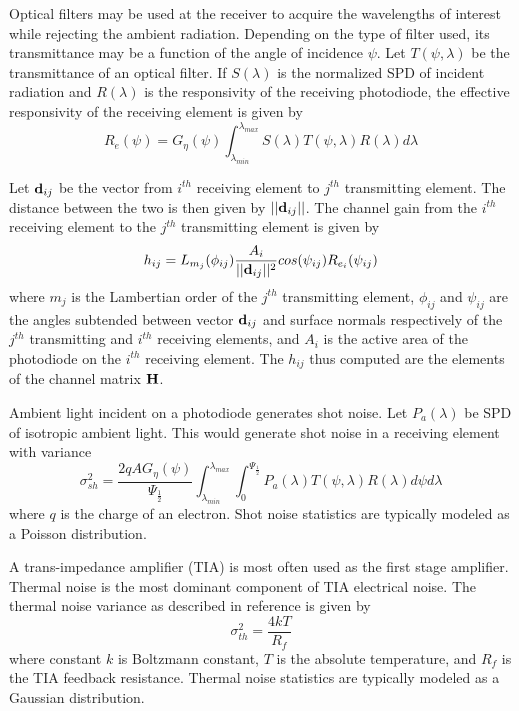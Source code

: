 Optical filters may be used at the receiver to acquire the wavelengths of interest while rejecting the ambient radiation. Depending on the type of filter used, its transmittance may be a function of the angle of incidence $\psi$. Let $T(\psi,\lambda)$ be the transmittance of an optical filter. If $S(\lambda)$ is the normalized SPD of incident radiation and $R(\lambda)$ is the responsivity of the receiving photodiode, the effective responsivity of the receiving element is given by
\begin{equation}
	\label{eqReff}
	R_e(\psi) = G_{\eta}(\psi)\int^{\lambda_{max}}_{\lambda_{min}}S(\lambda)T(\psi,\lambda)R(\lambda)d\lambda
\end{equation}

Let ${\bf{d}}_{ij}$ be the vector from $i^{th}$ receiving element to $j^{th}$ transmitting element. The distance between the two is then given by $||{\bf{d}}_{ij}||$. The channel gain from the $i^{th}$ receiving element to the $j^{th}$ transmitting element is given by
\begin{equation}
	\label{eqChGain}
	h_{ij} = L_{m_j}(\phi_{ij})\frac{A_i}{||\vm{d}_{ij}||^{2}}cos(\psi_{ij})R_{e_i}(\psi_{ij})
\end{equation}
where $m_j$ is the Lambertian order of the $j^{th}$ transmitting element, $\phi_{ij}$ and $\psi_{ij}$ are the angles subtended between vector ${\bf{d}}_{ij}$ and surface normals respectively of the $j^{th}$ transmitting and $i^{th}$ receiving elements, and $A_i$ is the active area of the photodiode on the $i^{th}$ receiving element. The $h_{ij}$ thus computed are the elements of the channel matrix ${\bf{H}}$.

Ambient light incident on a photodiode generates shot noise. Let $P_a(\lambda)$ be SPD of isotropic ambient light. This would generate shot noise in a receiving element with variance
\begin{equation}
	\label{eqNshot}
	\sigma_{sh}^{2} = \frac{2qAG_{\eta}(\psi)}{\Psi_{\frac{1}{2}}}\int_{\lambda_{min}}^{\lambda_{max}}\int_{0}^{\Psi_{\frac{1}{2}}}P_{a}(\lambda)T(\psi,\lambda)R(\lambda)d\psi d\lambda
\end{equation}
where $q$ is the charge of an electron. Shot noise statistics are typically modeled as a Poisson distribution. 

A trans-impedance amplifier (TIA) is most often used as the first stage amplifier. Thermal noise is the most dominant component of TIA electrical noise. The thermal noise variance as described in reference \cite{kah97a} is given by 
\begin{equation}
	\label{eqNth}
	\sigma_{th}^{2} = \frac{4kT}{R_{f}}
\end{equation}
where constant $k$ is Boltzmann constant, $T$ is the absolute temperature, and $R_{f}$ is the TIA feedback resistance. Thermal noise statistics are typically modeled as a Gaussian distribution.

